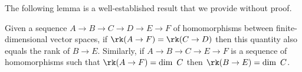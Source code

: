 The following lemma is a well-established result that we provide without proof.

\begin{lemma}\label{lem:sandwich}
    Given a sequence $A\to B\to C\to D\to E\to F$ of homomorphisms between finite-dimensional vector spaces, if $\rk(A\to F) = \rk(C\to D)$ then this quantity also equals the rank of $B\to E$.
    Similarly, if $A\to B\to C\to E\to F$ is a sequence of homomorphisms such that $\rk(A\to F) = \dim~C$ then $\rk(B\to E) = \dim~C$.
\end{lemma}


